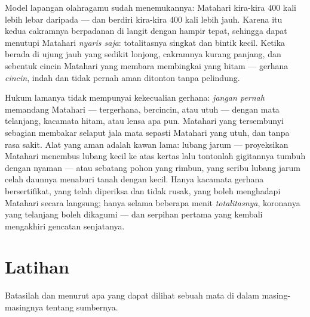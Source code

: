 \begin{example}\label{ex:g7:shadows-eclipses:coincidence}
Model lapangan olahragamu sudah menemukannya: Matahari kira-kira $400$
kali lebih lebar daripada  --- dan berdiri kira-kira $400$ kali
lebih jauh. Karena itu kedua cakramnya berpadanan di langit dengan
hampir tepat, sehingga  dapat menutupi Matahari \emph{nyaris
saja}: totalitasnya singkat dan bintik  kecil. Ketika 
berada di ujung jauh  yang sedikit lonjong, cakramnya kurang
panjang, dan sebentuk cincin Matahari yang membara membingkai 
yang hitam --- gerhana \emph{cincin}, indah dan tidak pernah aman
ditonton tanpa pelindung.
\end{example}

\begin{remark}\label{rem:g7:shadows-eclipses:safety}
Hukum lamanya tidak mempunyai kekecualian gerhana: \emph{jangan
pernah} memandang Matahari --- tergerhana, bercincin, atau utuh ---
dengan mata telanjang, kacamata hitam, atau lensa apa pun. Matahari
yang tersembunyi sebagian membakar selaput jala mata sepasti Matahari
yang utuh, dan tanpa rasa sakit. Alat yang aman adalah kawan lama:
lubang jarum --- proyeksikan  Matahari menembus lubang kecil
ke atas kertas lalu tontonlah gigitannya tumbuh dengan nyaman --- atau
sebatang pohon yang rimbun, yang seribu lubang jarum celah daunnya
menaburi tanah dengan  kecil. Hanya kacamata gerhana
bersertifikat, yang telah diperiksa dan tidak rusak, yang boleh
menghadapi Matahari secara langsung; hanya selama beberapa menit
\emph{totalitasnya}, koronanya yang telanjang boleh dikagumi --- dan
serpihan pertama yang kembali mengakhiri gencatan senjatanya.
\end{remark}

\section{Latihan}

\begin{exercise}[$\star$]\label{exo:g7:shadows-eclipses:1}
Batasilah  dan  menurut apa yang dapat dilihat sebuah
mata di dalam masing-masingnya tentang sumbernya.
\end{exercise}

